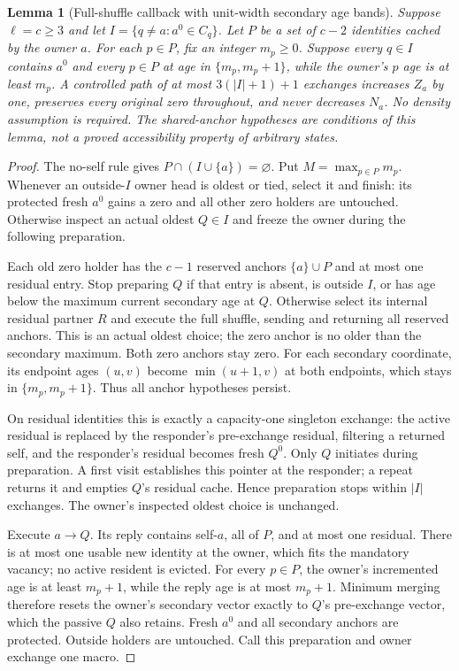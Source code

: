 \documentclass[11pt]{article}
\newtheorem{lemma}[theorem]{Lemma}
\begin{document}
\begin{lemma}[Full-shuffle callback with unit-width secondary age bands]
\label{lem:fullbandcallback}
Suppose $\ell=c\ge3$ and let $I=\{q\ne a:a^0\in C_q\}$.
Let $P$ be a set of $c-2$ identities cached by the owner $a$.
For each $p\in P$, fix an integer $m_p\ge0$. Suppose every
$q\in I$ contains $a^0$ and every $p\in P$ at age in
$\{m_p,m_p+1\}$, while the owner's $p$ age is at least $m_p$.
A controlled path of at most $3(|I|+1)+1$ exchanges increases
$Z_a$ by one, preserves every original zero throughout, and
never decreases $N_a$. No density assumption is required.
The shared-anchor hypotheses are conditions of this lemma,
not a proved accessibility property of arbitrary states.
\end{lemma}
\begin{proof}
The no-self rule gives $P\cap(I\cup\{a\})=\varnothing$.
Put $M=\max_{p\in P}m_p$. Whenever an outside-$I$ owner
head is oldest or tied, select it and finish: its protected
fresh $a^0$ gains a zero and all other zero holders are
untouched. Otherwise inspect an actual oldest $Q\in I$
and freeze the owner during the following preparation.

Each old zero holder has the $c-1$ reserved anchors
$\{a\}\cup P$ and at most one residual entry. Stop preparing
$Q$ if that entry is absent, is outside $I$, or has age
below the maximum current secondary age at $Q$. Otherwise
select its internal residual partner $R$ and execute the
full shuffle, sending and returning all reserved anchors.
This is an actual oldest choice; the zero anchor is no
older than the secondary maximum. Both zero anchors stay
zero. For each secondary coordinate, its endpoint ages
$(u,v)$ become $\min(u+1,v)$ at both endpoints, which stays
in $\{m_p,m_p+1\}$. Thus all anchor hypotheses persist.

On residual identities this is exactly a capacity-one
singleton exchange: the active residual is replaced by the
responder's pre-exchange residual, filtering a returned self,
and the responder's residual becomes fresh $Q^0$. Only $Q$
initiates during preparation. A first visit establishes this
pointer at the responder; a repeat returns it and empties
$Q$'s residual cache. Hence preparation stops within $|I|$
exchanges. The owner's inspected oldest choice is unchanged.

Execute $a\to Q$. Its reply contains self-$a$, all of $P$,
and at most one residual. There is at most one usable new
identity at the owner, which fits the mandatory vacancy;
no active resident is evicted. For every $p\in P$, the
owner's incremented age is at least $m_p+1$, while the
reply age is at most $m_p+1$. Minimum merging therefore
resets the owner's secondary vector exactly to $Q$'s
pre-exchange vector, which the passive $Q$ also retains.
Fresh $a^0$ and all secondary anchors are protected.
Outside holders are untouched. Call this preparation and
owner exchange one macro.


\end{proof}
\end{document}
